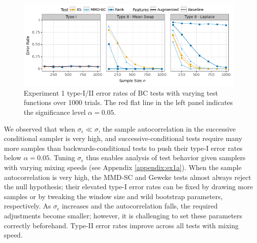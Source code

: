 \documentclass{article}
\begin{document}
\begin{figure}
    \centering
    \includegraphics[width=\textwidth]{figures/results_1.png}
    \caption{
        Experiment 1 type-I/II error rates of BC tests with varying test functions over 1000 trials. 
        The red flat line in the left panel indicates the significance level $\alpha=0.05$. 
    }
    \label{fig:ex1_aux}
\end{figure}

We observed that when $\sigma_{\epsilon} \ll \sigma$, the sample autocorrelation in the successive conditional sampler is very high, and successive-conditional tests require many more samples than backwards-conditional tests to push their type-I error rates below $\alpha=0.05$. Tuning $\sigma_{\epsilon}$ thus enables analysis of test behavior given samplers with varying mixing speeds (see Appendix \ref{appendix:ex1a}). When the sample autocorrelation is very high, the MMD-SC and Geweke tests almost always reject the null hypothesis; their elevated type-I error rates can be fixed by drawing more samples or by tweaking the window size and wild bootstrap parameters, respectively. As $\sigma_{\epsilon}$ increases and the autocorrelation falls, the required adjustments become smaller; however, it is challenging to set these parameters correctly beforehand. Type-II error rates improve across all tests with mixing speed.
\end{document}
